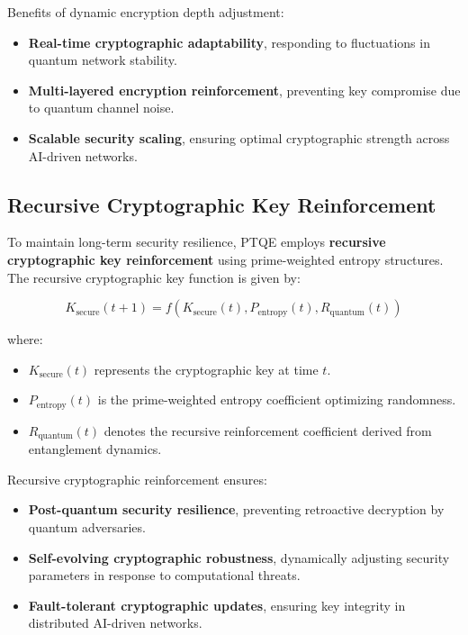 \documentclass{article}
\theoremstyle{plain}
\begin{document}
\begin{itemize}
Benefits of dynamic encryption depth adjustment:
\begin{itemize}
    \item \textbf{Real-time cryptographic adaptability}, responding to fluctuations in quantum network stability.
    \item \textbf{Multi-layered encryption reinforcement}, preventing key compromise due to quantum channel noise.
    \item \textbf{Scalable security scaling}, ensuring optimal cryptographic strength across AI-driven networks.
\end{itemize}

\subsection{Recursive Cryptographic Key Reinforcement}

To maintain long-term security resilience, PTQE employs \textbf{recursive cryptographic key reinforcement} using prime-weighted entropy structures. The recursive cryptographic key function is given by:

\begin{equation}
    K_{\text{secure}}(t+1) = f(K_{\text{secure}}(t), P_{\text{entropy}}(t), R_{\text{quantum}}(t))
\end{equation}

where:
\begin{itemize}
    \item \( K_{\text{secure}}(t) \) represents the cryptographic key at time \( t \).
    \item \( P_{\text{entropy}}(t) \) is the prime-weighted entropy coefficient optimizing randomness.
    \item \( R_{\text{quantum}}(t) \) denotes the recursive reinforcement coefficient derived from entanglement dynamics.
\end{itemize}

Recursive cryptographic reinforcement ensures:
\begin{itemize}
    \item \textbf{Post-quantum security resilience}, preventing retroactive decryption by quantum adversaries.
    \item \textbf{Self-evolving cryptographic robustness}, dynamically adjusting security parameters in response to computational threats.
    \item \textbf{Fault-tolerant cryptographic updates}, ensuring key integrity in distributed AI-driven networks.
\end{itemize}


\end{itemize}
\end{document}
